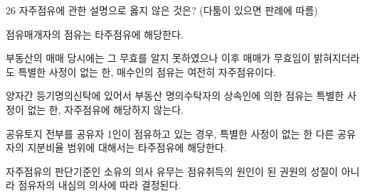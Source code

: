 \begin{question}{26}
자주점유에 관한 설명으로 옳지 않은 것은? (다툼이 있으면 판례에 따름)
\begin{choices}
  \item 점유매개자의 점유는 타주점유에 해당한다.
  \item 부동산의 매매 당시에는 그 무효를 알지 못하였으나 이후 매매가 무효임이 밝혀지더라도 특별한 사정이 없는 한, 매수인의 점유는 여전히 자주점유이다.
  \item 양자간 등기명의신탁에 있어서 부동산 명의수탁자의 상속인에 의한 점유는 특별한 사정이 없는 한, 자주점유에 해당하지 않는다.
  \item 공유토지 전부를 공유자 1인이 점유하고 있는 경우, 특별한 사정이 없는 한 다른 공유자의 지분비율 범위에 대해서는 타주점유에 해당한다.
  \item 자주점유의 판단기준인 소유의 의사 유무는 점유취득의 원인이 된 권원의 성질이 아니라 점유자의 내심의 의사에 따라 결정된다.
\end{choices}
\end{question}
